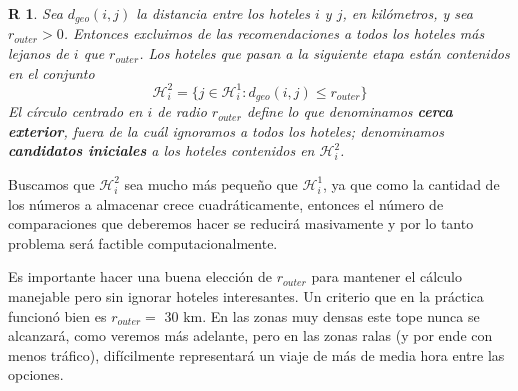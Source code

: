 \documentclass[12pt]{report}
\newtheorem{regla}{R}%
\begin{document}
\begin{regla}
Sea $d_{geo}(i,j)$ la distancia entre los hoteles $i$ y $j$, en kilómetros, y sea $r_{outer} > 0$. Entonces excluimos de las recomendaciones a todos los hoteles más lejanos de $i$ que $r_{outer}$. Los hoteles que pasan a la siguiente etapa están contenidos en el conjunto
\[
\mathcal{H}_i^2 = \{j \in \mathcal{H}_i^1 : d_{geo}(i,j) \leq r_{outer}\}
\]
El círculo centrado en $i$ de radio $r_{outer}$ define lo que denominamos \textbf{cerca exterior}, fuera de la cuál ignoramos a todos los hoteles; denominamos \textbf{candidatos iniciales} a los hoteles contenidos en $\mathcal{H}_i^2$.
\end{regla}
Buscamos que $\mathcal{H}_i^2$ sea mucho más pequeño que $\mathcal{H}_i^1$, ya que como la cantidad de los números a almacenar crece cuadráticamente, entonces el número de comparaciones que deberemos hacer se reducirá masivamente y por lo tanto problema será factible computacionalmente.

Es importante hacer una buena elección de $r_{outer}$ para mantener el cálculo manejable pero sin ignorar hoteles interesantes. Un criterio que en la práctica funcionó bien es $r_{outer} =$ 30 km. En las zonas muy densas este tope nunca se alcanzará, como veremos más adelante, pero en las zonas ralas (y por ende con menos tráfico), difícilmente representará un viaje de más de media hora entre las opciones.


\end{document}
